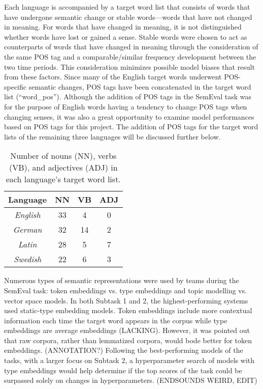 Each language is accompanied by a target word list that consists of words that have undergone semantic change or stable words—words that have not changed in meaning. For words that have changed in meaning, it is not distinguished whether words have lost or gained a sense. Stable words were chosen to act as counterparts of words that have changed in meaning through the consideration of the same POS tag and a comparable/similar frequency development between the two time periods. This consideration minimizes possible model biases that result from these factors. \citep{dubossarsky-etal-2017-outta} Since many of the English target words underwent POS-specific semantic changes, POS tags have been concatenated in the target word list (“word\_pos”). Although the addition of POS tags in the SemEval task was for the purpose of English words having a tendency to change POS tags when changing senses, it was also a great opportunity to examine model performances based on POS tags for this project. The addition of POS tags for the target word lists of the remaining three languages will be discussed further below.
 
\begin{table}[h]
\small
\centering
\begin{tabular}{|c|c|c|c|}
\hline
\textbf{Language} & \textbf{NN} & \textbf{VB} & \textbf{ADJ} \\ \hline
\textit{English}                          & 33          & 4           & 0            \\ \hline
\textit{German}                           & 32          & 14          & 2            \\ \hline
\textit{Latin}                            & 28          & 5           & 7            \\ \hline
\textit{Swedish}                          & 22          & 6           & 3            \\ \hline
\end{tabular}
\caption{Number of nouns (NN), verbs (VB), and adjectives (ADJ) in each language's target word list.}
\label{tab:postag-breakdown}
\end{table}

Numerous types of semantic representations were used by teams during the SemEval task: token embeddings vs. type embeddings and topic modelling vs. vector space models. In both Subtask 1 and 2, the highest-performing systems used static-type embedding models. Token embeddings include more contextual information each time the target word appears in the corpus while type embeddings are average embeddings (LACKING). However, it was pointed out that raw corpora, rather than lemmatized corpora, would bode better for token embeddings. (ANNOTATION?) Following the best-performing models of the tasks, with a larger focus on Subtask 2, a hyperparameter search of models with type embeddings would help determine if the top scores of the task could be surpassed solely on changes in hyperparameters. (ENDSOUNDS WEIRD, EDIT)
